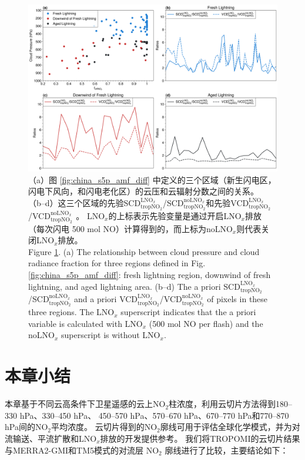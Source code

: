 \begin{figure}[!htbp]
    \centering
    \includegraphics[width=14cm]{./figures/china_amf_contribution.png}
    \caption{
    （a）图 \ref{fig:china_s5p_amf_diff} 中定义的三个区域（新生闪电区，闪电下风向，和闪电老化区）的云压和云辐射分数之间的关系。
     （b--d）这三个区域的先验SCD$^{\textrm{LNO$_x$}}_{\textrm{tropNO$_2$}}$/SCD$^{\textrm{noLNO$_x$}}_{ \textrm{tropNO$_2$}}$和先验VCD$^{\textrm{LNO$_x$}}_{\textrm{tropNO$_2$}}$/VCD$^{\textrm{noLNO$_x$ }}_{\textrm{tropNO$_2$}}$。
     LNO$_x$的上标表示先验变量是通过开启LNO$_x$排放（每次闪电 500 mol NO）计算得到的，而上标为noLNO$_x$则代表关闭LNO$_x$排放。\\
     Figure \ref{fig:china_amf_contribution}. (a) The relationship between cloud pressure and cloud radiance fraction for three regions defined in Fig. \ref{fig:china_s5p_amf_diff}: fresh lightning region, downwind of fresh lightning, and aged lightning area.
    (b--d) The a priori SCD$^{\textrm{LNO$_x$}}_{\textrm{tropNO$_2$}}$/SCD$^{\textrm{noLNO$_x$}}_{\textrm{tropNO$_2$}}$ and a priori VCD$^{\textrm{LNO$_x$}}_{\textrm{tropNO$_2$}}$/VCD$^{\textrm{noLNO$_x$}}_{\textrm{tropNO$_2$}}$ of pixels in these three regions. The LNO$_x$ superscript indicates that the a priori variable is calculated with LNO$_x$ (500 mol NO per flash) and the noLNO$_x$ superscript is without LNO$_x$.
    }
    \label{fig:china_amf_contribution}
\end{figure}


\section{本章小结}

本章基于不同云高条件下卫星遥感的云上NO$_2$柱浓度，利用云切片方法得到180--330 hPa、330--450 hPa、
450--570 hPa、570--670 hPa、670--770 hPa和770--870 hPa间的NO$_2$平均浓度。
云切片得到的NO$_2$廓线可用于评估全球化学模式，并为对流输送、平流扩散和LNO$_x$排放的开发提供参考。
我们将TROPOMI的云切片结果与MERRA2-GMI和TM5模式的对流层 NO$_2$ 廓线进行了比较，主要结论如下：

